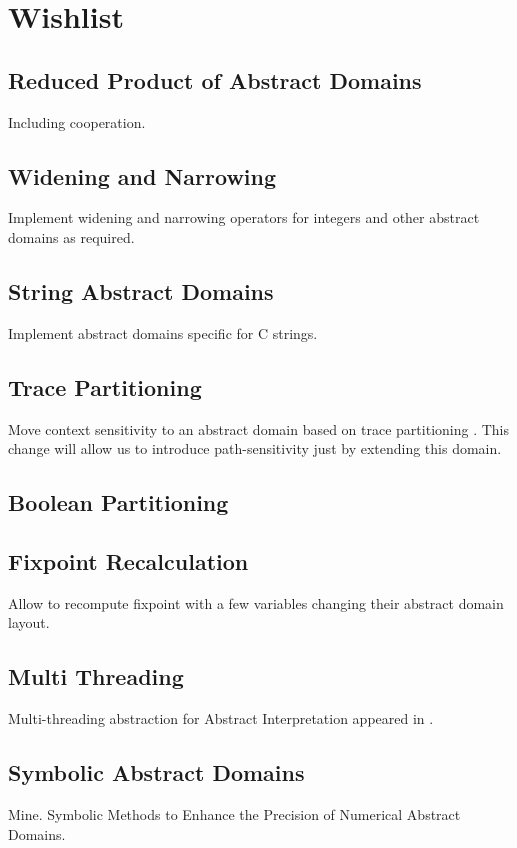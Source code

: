 \documentclass[a4paper]{book}
\begin{document}
\chapter{Wishlist}

\section{Reduced Product of Abstract Domains}
Including cooperation.

\section{Widening and Narrowing}
Implement widening and narrowing operators for integers and other
abstract domains as required.

\section{String Abstract Domains}
Implement abstract domains specific for C strings.

\section{Trace Partitioning}
Move context sensitivity to an abstract domain based on trace
partitioning \cite{MR05}.  This change will allow us to introduce
path-sensitivity just by extending this domain.

\section{Boolean Partitioning}

\section{Fixpoint Recalculation}
Allow to recompute fixpoint with a few variables changing their
abstract domain layout.

\section{Multi Threading}
Multi-threading abstraction for Abstract Interpretation appeared in
\cite{M11}.

\section{Symbolic Abstract Domains}
Mine.  Symbolic Methods to Enhance the Precision of Numerical Abstract
Domains.
\end{document}
